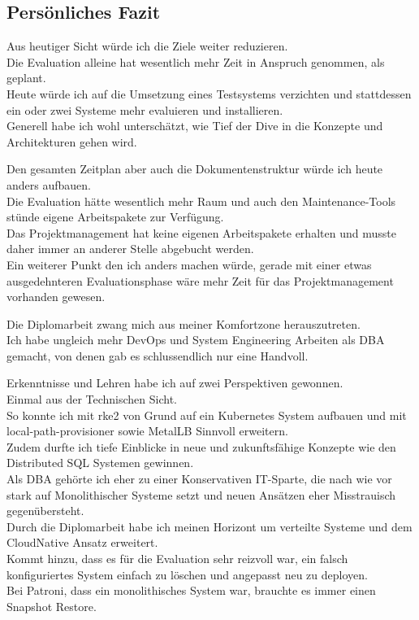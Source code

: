 
\begin{flushleft}
    \section{Persönliches Fazit}
    Aus heutiger Sicht würde ich die Ziele weiter reduzieren.\\
    Die Evaluation alleine hat wesentlich mehr Zeit in Anspruch genommen, als geplant.\\
    Heute würde ich auf die Umsetzung eines Testsystems verzichten und stattdessen ein oder zwei Systeme mehr evaluieren und installieren.\\
    Generell habe ich wohl unterschätzt, wie Tief der Dive in die Konzepte und Architekturen gehen wird.
\end{flushleft}
\begin{flushleft}
    Den gesamten Zeitplan aber auch die Dokumentenstruktur würde ich heute anders aufbauen.\\
    Die Evaluation hätte wesentlich mehr Raum und auch den Maintenance-Tools stünde eigene Arbeitspakete zur Verfügung.\\
    Das Projektmanagement hat keine eigenen Arbeitspakete erhalten und musste daher immer an anderer Stelle abgebucht werden.\\
    Ein weiterer Punkt den ich anders machen würde, gerade mit einer etwas ausgedehnteren Evaluationsphase wäre mehr Zeit für das Projektmanagement vorhanden gewesen.
\end{flushleft}
\begin{flushleft}
    Die Diplomarbeit zwang mich aus meiner Komfortzone herauszutreten.\\
    Ich habe ungleich mehr DevOps und System Engineering Arbeiten als DBA gemacht, von denen gab es schlussendlich nur eine Handvoll.
\end{flushleft}
\begin{flushleft}
    Erkenntnisse und Lehren habe ich auf zwei Perspektiven gewonnen.\\
    Einmal aus der Technischen Sicht.\\
    So konnte ich mit \gls{rke2} von Grund auf ein \Gls{Kubernetes} System aufbauen und mit \gls{local-path-provisioner} sowie \Gls{MetalLB} Sinnvoll erweitern.\\
    Zudem durfte ich tiefe Einblicke in neue und zukunftsfähige Konzepte wie den Distributed SQL Systemen gewinnen.\\
    Als DBA gehörte ich eher zu einer Konservativen IT-Sparte, die nach wie vor stark auf Monolithischer Systeme setzt und neuen Ansätzen eher Misstrauisch gegenübersteht.\\
    Durch die Diplomarbeit habe ich meinen Horizont um verteilte Systeme und dem CloudNative Ansatz erweitert.\\
    Kommt hinzu, dass es für die Evaluation sehr reizvoll war, ein falsch konfiguriertes System einfach zu löschen und angepasst neu zu deployen.\\
    Bei Patroni, dass ein monolithisches System war, brauchte es immer einen Snapshot Restore.
\end{flushleft}
